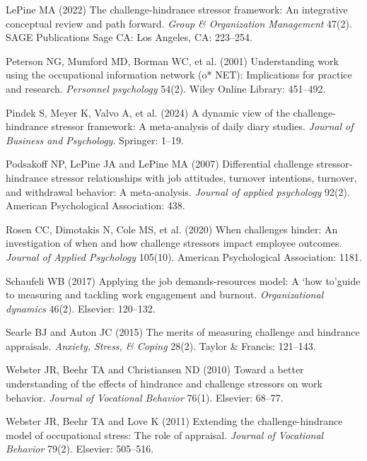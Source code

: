 \documentclass[
  man]{apa7}
\newlength{\cslhangindent}
\newlength{\cslentryspacingunit} %
\newenvironment{CSLReferences}[2] %
 {%
  \setlength{\parindent}{0pt}
  \ifodd #1
  \let\oldpar\par
  \def\par{\hangindent=\cslhangindent\oldpar}
  \fi
  \setlength{\parskip}{#2\cslentryspacingunit}
 }%
 {}
\begin{document}
\begin{CSLReferences}{1}{0}
\leavevmode{}%
LePine MA (2022) The challenge-hindrance stressor framework: An integrative conceptual review and path forward. \emph{Group \& Organization Management} 47(2). SAGE Publications Sage CA: Los Angeles, CA: 223--254.

\leavevmode{}%
Peterson NG, Mumford MD, Borman WC, et al. (2001) Understanding work using the occupational information network (o* NET): Implications for practice and research. \emph{Personnel psychology} 54(2). Wiley Online Library: 451--492.

\leavevmode{}%
Pindek S, Meyer K, Valvo A, et al. (2024) A dynamic view of the challenge-hindrance stressor framework: A meta-analysis of daily diary studies. \emph{Journal of Business and Psychology}. Springer: 1--19.

\leavevmode{}%
Podsakoff NP, LePine JA and LePine MA (2007) Differential challenge stressor-hindrance stressor relationships with job attitudes, turnover intentions, turnover, and withdrawal behavior: A meta-analysis. \emph{Journal of applied psychology} 92(2). American Psychological Association: 438.

\leavevmode{}%
Rosen CC, Dimotakis N, Cole MS, et al. (2020) When challenges hinder: An investigation of when and how challenge stressors impact employee outcomes. \emph{Journal of Applied Psychology} 105(10). American Psychological Association: 1181.

\leavevmode{}%
Schaufeli WB (2017) Applying the job demands-resources model: A `how to'guide to measuring and tackling work engagement and burnout. \emph{Organizational dynamics} 46(2). Elsevier: 120--132.

\leavevmode{}%
Searle BJ and Auton JC (2015) The merits of measuring challenge and hindrance appraisals. \emph{Anxiety, Stress, \& Coping} 28(2). Taylor \& Francis: 121--143.

\leavevmode{}%
Webster JR, Beehr TA and Christiansen ND (2010) Toward a better understanding of the effects of hindrance and challenge stressors on work behavior. \emph{Journal of Vocational Behavior} 76(1). Elsevier: 68--77.

\leavevmode{}%
Webster JR, Beehr TA and Love K (2011) Extending the challenge-hindrance model of occupational stress: The role of appraisal. \emph{Journal of Vocational Behavior} 79(2). Elsevier: 505--516.


\end{CSLReferences}
\end{document}
